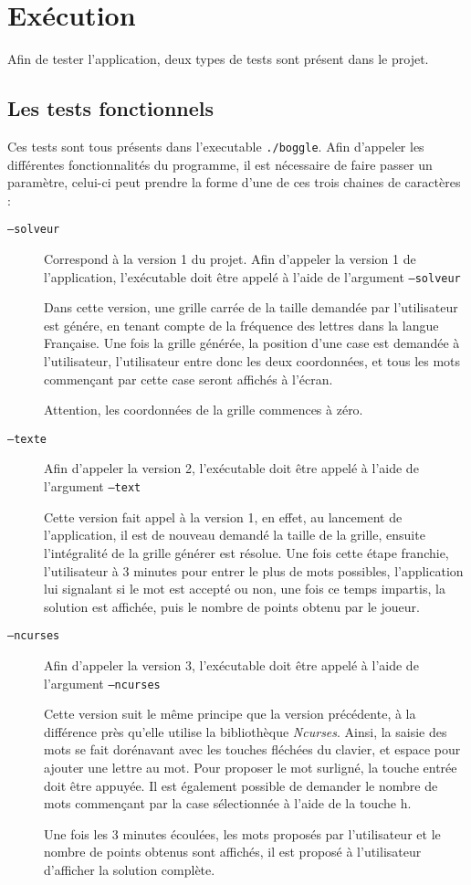 \documentclass[12pt,a4paper,openany]{book}
\begin{document}
	\section{Exécution}
	Afin de tester l'application, deux types de tests sont présent dans le projet.

		\subsection{Les tests fonctionnels} Ces tests sont tous présents dans l'executable
			\texttt{./boggle}. Afin d'appeler les différentes fonctionnalités du programme, il
			est nécessaire de faire passer un paramètre, celui-ci peut prendre la forme d'une
			de ces trois chaines de caractères : 
			\begin{description}
				\item[\texttt{--solveur}] Correspond à la version 1 du projet.
Afin d'appeler la version 1 de l'application, l'exécutable doit être appelé à l'aide de
l'argument \texttt{--solveur}

Dans cette version, une grille carrée de la taille demandée par l'utilisateur est génére, en
tenant compte de la fréquence des lettres dans la langue Française. Une fois la grille
générée, la position d'une case est demandée à l'utilisateur, l'utilisateur entre donc les
deux coordonnées, et tous les mots commençant par cette case seront affichés à l'écran.

Attention, les coordonnées de la grille commences à zéro.
				\item[\texttt{--texte}]
					Afin d'appeler la version 2, l'exécutable doit être appelé à l'aide de
					l'argument \texttt{--text}

					Cette version fait appel à la version 1, en effet, au lancement de
					l'application, il est de nouveau demandé la taille de la grille, ensuite
					l'intégralité de la grille générer est résolue. Une fois cette étape
					franchie, l'utilisateur à 3 minutes pour entrer le plus de mots possibles,
					l'application lui signalant si le mot est accepté ou non, une fois ce
					temps impartis, la solution est affichée, puis le nombre de points obtenu
					par le joueur.
				\item[\texttt{--ncurses}]
					Afin d'appeler la version 3, l'exécutable doit être appelé à l'aide de
					l'argument \texttt{--ncurses}

					Cette version suit le même principe que la version précédente, à la
					différence près qu'elle utilise la bibliothèque \textit{Ncurses}. Ainsi, la saisie
					des mots se fait dorénavant avec les touches fléchées du clavier, et
					espace pour ajouter une lettre au mot. Pour proposer le mot surligné, la
					touche entrée doit être appuyée. Il est également possible de demander le
					nombre de mots commençant par la case sélectionnée à l'aide de la touche
					h.

					Une fois les 3 minutes écoulées, les mots proposés par l'utilisateur et le
					nombre de points obtenus sont affichés, il est proposé à l'utilisateur
					d'afficher la solution complète. 
			\end{description}
\end{document}
